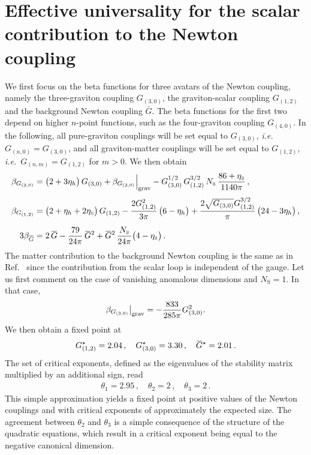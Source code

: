 \documentclass[11pt]{book}
\newcommand{\overbar}[1]{\mkern 1.5mu\overline{\mkern-1.5mu#1\mkern-1.5mu}\mkern 1.5mu}
\newcommand\etaS{ \eta_{\scriptscriptstyle{\mathrm{S}}} }
\newcommand\NS{ N_{\scriptscriptstyle{\mathrm{S}}} }
\newcommand\Gback{ \overbar{G} } %
\newcommand\ie{\textit{i.e.}\ }
\numberwithin{equation}{chapter}
\begin{document}
\section{Effective universality for the scalar contribution to the Newton coupling}

We first focus on the beta functions for three avatars of the Newton coupling,
namely the three-graviton coupling $G_{(3,0)}$,
the graviton-scalar coupling $G_{(1,2)}$ and the background Newton coupling $\bar{G}$.
The beta functions for the first two depend on higher $n$-point functions,
such as the four-graviton coupling $G_{(4,0)}$.
In the following, all pure-graviton couplings will be set equal to $G_{(3,0)}$,
\ie $G_{(n,0)}= G_{(3,0)}$, and all graviton-matter couplings will be set equal to $G_{(1,2)}$,
\ie $G_{(n,m)}=G_{(1,2)}$ for $m>0$.
We then obtain
\begin{align}
  \beta_{G_{(3,0)}} &=  \big( 2+3 \eta_h \big) \, G_{(3,0)}
  + \beta_{G_{(3,0)}}\Big|_{\rm grav}
  - G_{(3,0)}^{1/2} \, G_{(1,2)}^{3/2} \, \NS \, \frac{86+\etaS}{1140 \pi} \,,
  \label{eq:betaG3} \\[3pt]
  \beta_{G_{(1,2)}} &= \big( 2 + \eta_h + 2 \etaS \big) \, G_{(1,2)}
  -  \frac{2G_{(1,2)}^2}{3\pi} \, \big(6-\eta_h\big)
  +\frac{ 2\sqrt{G_{(3,0)}}G_{(1,2)}^{3/2} }{\pi} \, \big( 24-3 \eta_h \big)
  \,,
  \label{eq:betag3} \\[5pt]
  \vphantom{ G^2 }{ 3 }
  \beta_{\Gback} &= 2 \, \Gback - \frac{79}{24\pi} \, \Gback^2
  + \Gback^2 \, \frac{\NS}{24\pi} \big( 4-\etaS \big) \,.
  \label{eq:betaGbar}
\end{align}
The matter contribution to the background Newton coupling is the same as in Ref.~\cite{Dona:2013qba}
since the contribution from the scalar loop is independent of the gauge.
Let us first comment on the case of vanishing anomalous dimensions and $\NS=1$.
In that case,
\begin{align}
  \beta_{G_{(3,0)}}\big|_{\rm grav}=- \frac{833}{285\pi}G_{(3,0)}^2.
\end{align}
We then obtain a fixed point at
\begin{align}
  G_{(1,2)}^{\star}=2.04 \,, \quad G_{(3,0)}^{\star}=3.30 \,, \quad \Gback^{\star}=2.01 \,.
\end{align}
The set of critical exponents, defined as the eigenvalues of the stability matrix multiplied by an additional sign, read
\begin{align}
  \theta_1=2.95 \,, \quad \theta_2=2 \,, \quad \theta_3=2 \,.
\end{align}
This simple approximation yields a fixed point at positive values of the Newton couplings and with critical exponents of approximately the expected size. The agreement between $\theta_2$ and $\theta_3$ is a simple consequence of the structure of the quadratic equations, which result in a critical exponent being equal to the negative canonical dimension.
\end{document}
